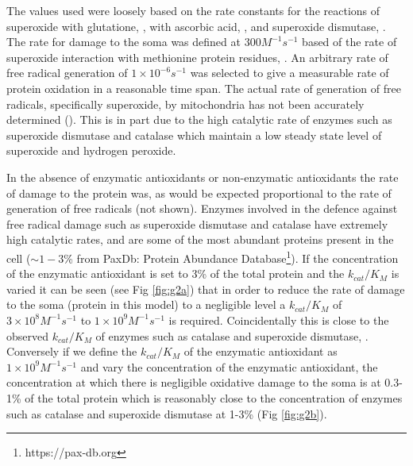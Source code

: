 \documentclass[preprint,12pt,authoryear]{elsarticle}
\begin{document}
The values used were loosely based on the rate constants for the reactions of superoxide with glutatione, \citet{Winterbourn:2016cu}, 
with ascorbic acid, \citet{Buettner:1996vo},
and superoxide dismutase, \citet{Milgrom:2016iw}. The rate for damage to the soma was defined at $300 M^{-1} s^{-1}$ based of the rate of superoxide
interaction with methionine protein residues, \citet{Davies:2016kz}.
An arbitrary rate of free radical generation of $1 \times 10^{-6} s^{-1}$ was selected to give a
measurable rate of protein oxidation in a reasonable time span. The actual rate of
generation of free radicals, specifically superoxide, by mitochondria has not been accurately determined (\cite{Murphy:2009jy}). This is in part due to the high catalytic rate of enzymes such as superoxide dismutase and catalase which maintain a low steady state level of superoxide and hydrogen peroxide.

In the absence of enzymatic antioxidants or non-enzymatic antioxidants the rate of damage to the protein was, as would be
expected proportional to the rate of generation of free radicals (not shown).
Enzymes involved in the defence against free radical damage such as superoxide dismutase and catalase have extremely high catalytic rates, and are some of the most abundant proteins present in the cell ($\sim 1-3$\% from PaxDb:
Protein Abundance Database\footnote{https://pax-db.org}). If the concentration of the enzymatic antioxidant is
set to 3\% of the total protein and the $k_{cat}/K_M$ is varied it can be seen (see Fig \ref{fig:g2a}) that
in order to reduce the rate of damage to the soma (protein in this model) to a negligible level a $k_{cat}/K_M$ of
$3 \times 10^8 M^{-1} s^{-1}$ to $1 \times 10^9 M^{-1} s^{-1}$ is required.
Coincidentally this is close to the observed
$k_{cat}/K_M$ of enzymes such as catalase and superoxide dismutase, \citet{Milgrom:2016iw}. Conversely if we define the $k_{cat}/K_M$ of
the enzymatic antioxidant as $1 \times 10^9 M^{-1} s^{-1}$ and vary the concentration of the enzymatic antioxidant, the
concentration at which there is negligible oxidative damage to the soma is at
0.3-1\% of the total protein which is reasonably close to the concentration of enzymes such as catalase and superoxide dismutase
at 1-3\% (Fig \ref{fig:g2b}).
\end{document}

